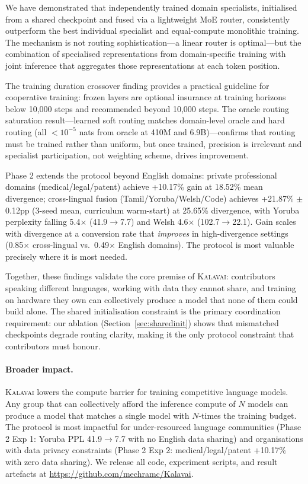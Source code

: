 \documentclass{article}
\newcommand{\kalavai}{\textsc{Kalavai}\xspace}
\begin{document}
We have demonstrated that independently trained domain specialists, initialised from a shared checkpoint and fused via a lightweight MoE router, consistently outperform the best individual specialist and equal-compute monolithic training. The mechanism is not routing sophistication---a linear router is optimal---but the combination of specialised representations from domain-specific training with joint inference that aggregates those representations at each token position.

The training duration crossover finding provides a practical guideline for cooperative training: frozen layers are optional insurance at training horizons below 10,000 steps and recommended beyond 10,000 steps. The oracle routing saturation result---learned soft routing matches domain-level oracle and hard routing (all ${<}10^{-5}$ nats from oracle at 410M and 6.9B)---confirms that routing must be trained rather than uniform, but once trained, precision is irrelevant and specialist participation, not weighting scheme, drives improvement.

Phase 2 extends the protocol beyond English domains: private professional domains (medical/legal/patent) achieve +10.17\% gain at 18.52\% mean divergence; cross-lingual fusion (Tamil/Yoruba/Welsh/Code) achieves +21.87\% $\pm$0.12pp (3-seed mean, curriculum warm-start) at 25.65\% divergence, with Yoruba perplexity falling 5.4$\times$ (41.9$\to$7.7) and Welsh 4.6$\times$ (102.7$\to$22.1). Gain scales with divergence at a conversion rate that \emph{improves} in high-divergence settings (0.85$\times$ cross-lingual vs.\ 0.49$\times$ English domains). The protocol is most valuable precisely where it is most needed.

Together, these findings validate the core premise of \kalavai: contributors speaking different languages, working with data they cannot share, and training on hardware they own can collectively produce a model that none of them could build alone. The shared initialisation constraint is the primary coordination requirement: our ablation (Section~\ref{sec:sharedinit}) shows that mismatched checkpoints degrade routing clarity, making it the only protocol constraint that contributors must honour.

\paragraph{Broader impact.} \kalavai lowers the compute barrier for training competitive language models. Any group that can collectively afford the inference compute of $N$ models can produce a model that matches a single model with $N$-times the training budget. The protocol is most impactful for under-resourced language communities (Phase 2 Exp 1: Yoruba PPL 41.9$\to$7.7 with no English data sharing) and organisations with data privacy constraints (Phase 2 Exp 2: medical/legal/patent +10.17\% with zero data sharing). We release all code, experiment scripts, and result artefacts at \url{https://github.com/mechramc/Kalavai}.
\end{document}
